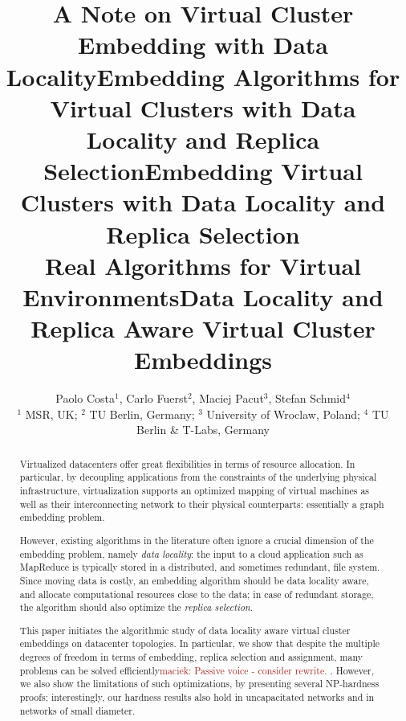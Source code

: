 \documentclass[9pt]{sigcomm-alternate}
\title{A Note on Virtual Cluster Embedding with Data Locality}
\title{Embedding Algorithms for Virtual Clusters with Data Locality and Replica Selection}
\title{Embedding Virtual Clusters with Data Locality and Replica Selection\\{\Large Real Algorithms for Virtual Environments}}
\title{Data Locality and Replica Aware Virtual Cluster Embeddings}
\author{Paolo Costa$^1$, Carlo Fuerst$^2$, Maciej Pacut$^3$, Stefan Schmid$^4$\\
{\small $^1$ MSR, UK; $^2$ TU Berlin, Germany; $^3$ University of Wroclaw, Poland; $^4$ TU Berlin \& T-Labs, Germany}}
\newcommand{\maciek}[1]{\textcolor{brown}{maciek: #1}}
\begin{document}
\maketitle


\begin{abstract}
Virtualized datacenters offer great flexibilities in terms of resource allocation. In particular, by
decoupling applications from the constraints of the underlying physical infrastructure, virtualization
supports an optimized mapping of virtual machines as well as their interconnecting network
to their
physical counterparts: essentially a graph embedding problem.

However, existing algorithms
in the literature often ignore a crucial dimension of the embedding problem, namely \emph{data locality}:
the input to a cloud application such as MapReduce is typically stored in a distributed,
and sometimes redundant, file system. Since moving
data is costly, an embedding algorithm should be data locality aware,
and allocate computational resources close to the data; in case of redundant storage, the algorithm should also optimize the \emph{replica selection}.

This paper initiates the algorithmic study of data locality aware virtual cluster embeddings
on datacenter topologies.
In particular, we
show that
despite the multiple degrees of freedom in terms of embedding, replica selection and assignment,
many problems can be
solved efficiently\maciek{Passive voice - consider rewrite.}
. However, we also show the limitations of such optimizations,
by presenting several NP-hardness proofs; interestingly,
our hardness results also hold in uncapacitated networks and in networks of small diameter.
\end{abstract}


%
\end{document}
